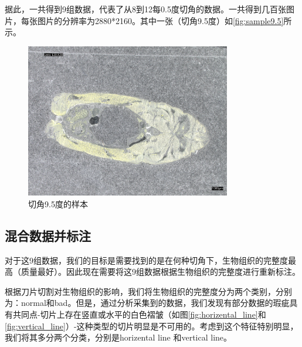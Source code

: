 
据此，一共得到9组数据，代表了从8到12每0.5度切角的数据。一共得到几百张图片，每张图片的分辨率为2880*2160。其中一张（切角9.5度）如\autoref{fig:sample9.5}所示。

\begin{figure}
    \centering
    \includegraphics[width=0.8\textwidth]{./fig/sample9.5.jpg}
    \caption{切角9.5度的样本}
    \label{fig:sample9.5}
\end{figure}


\subsection{混合数据并标注}

对于这9组数据，我们的目标是需要找到的是在何种切角下，生物组织的完整度最高（质量最好）。因此现在需要将这9组数据根据生物组织的完整度进行重新标注。

根据刀片切割对生物组织的影响，我们将生物组织的完整度分为两个类别，分别为：normal和bad。但是，通过分析采集到的数据，我们发现有部分数据的瑕疵具有共同点-切片上存在竖直或水平的白色褶皱（如图\autoref{fig:horizental_line}和\autoref{fig:vertical_line}）-这种类型的切片明显是不可用的。考虑到这个特征特别明显，我们将其多分两个分类，分别是horizental line 和vertical line。 

